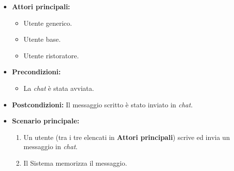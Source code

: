 \label{usecase:Invio messaggio chat}
\begin{itemize}
	\item \textbf{Attori principali:} 
	\begin{itemize}
        \item Utente generico.
        \item Utente base.
        \item Utente ristoratore.
    \end{itemize}

	\item \textbf{Precondizioni:}
	\begin{itemize}
        \item La \textit{chat} è stata avviata.
    \end{itemize}

	\item \textbf{Postcondizioni:} Il messaggio scritto è stato inviato in \textit{chat}.

	\item \textbf{Scenario principale:}
            \begin{enumerate}
                \item Un utente (tra i tre elencati in \textbf{Attori principali}) scrive ed invia un messaggio in \textit{chat}.
                \item Il Sistema memorizza il messaggio.
	      \end{enumerate}
\end{itemize}